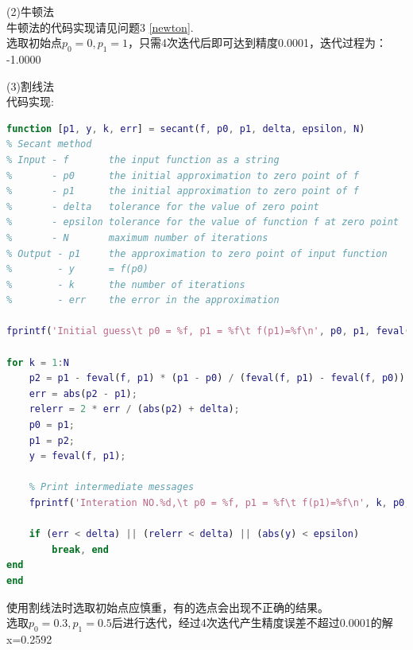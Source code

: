 \documentclass[UTF8]{ctexart}
\begin{document}
(2)牛顿法\\
牛顿法的代码实现请见问题3 \ref{newton}.\\
选取初始点$p_0=0,p_1=1$，只需4次迭代后即可达到精度0.0001，迭代过程为：\\
-1.0000

(3)割线法\\
代码实现:
\begin{lstlisting}[language=matlab]
function [p1, y, k, err] = secant(f, p0, p1, delta, epsilon, N)
% Secant method
% Input - f       the input function as a string
%       - p0      the initial approximation to zero point of f
%       - p1      the initial approximation to zero point of f
%       - delta   tolerance for the value of zero point
%       - epsilon tolerance for the value of function f at zero point
%       - N       maximum number of iterations
% Output - p1     the approximation to zero point of input function
%        - y      = f(p0)
%        - k      the number of iterations
%        - err    the error in the approximation

fprintf('Initial guess\t p0 = %f, p1 = %f\t f(p1)=%f\n', p0, p1, feval(f, p1));

for k = 1:N
	p2 = p1 - feval(f, p1) * (p1 - p0) / (feval(f, p1) - feval(f, p0));
	err = abs(p2 - p1);
	relerr = 2 * err / (abs(p2) + delta);
	p0 = p1;
	p1 = p2;
	y = feval(f, p1);

	% Print intermediate messages
	fprintf('Interation NO.%d,\t p0 = %f, p1 = %f\t f(p1)=%f\n', k, p0, p1, y);

	if (err < delta) || (relerr < delta) || (abs(y) < epsilon)
		break, end
end
end
\end{lstlisting}
使用割线法时选取初始点应慎重，有的选点会出现不正确的结果。\\
选取$p_0=0.3,p_1=0.5$后进行迭代，经过4次迭代产生精度误差不超过0.0001的解x=0.2592
\end{document}
